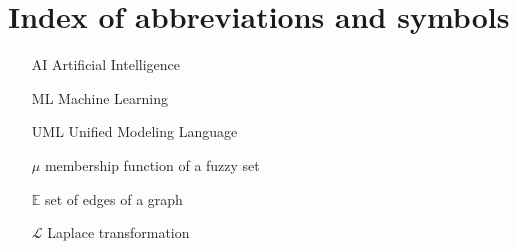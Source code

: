 
\chapter{Index of abbreviations and symbols}

\begin{itemize}
\item[AI] Artificial Intelligence
\item[ML] Machine Learning 
\item[UML] Unified Modeling Language
\item[$\mu$] membership function of a fuzzy set
\item[$\mathbb{E}$] set of edges of a graph
\item[$\mathcal{L}$] Laplace transformation
\end{itemize}
